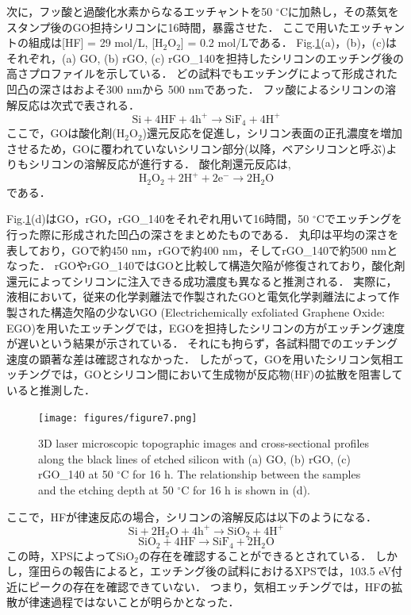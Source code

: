 \documentclass[platex,dvipdfmx]{jlreq}			%
\begin{document}
次に，フッ酸と過酸化水素からなるエッチャントを50 ${}^\circ$Cに加熱し，その蒸気をスタンプ後のGO担持シリコンに16時間，暴露させた．
ここで用いたエッチャントの組成は[HF] = 29 mol/L, [H$_2$O$_2$] = 0.2 mol/Lである．
Fig.\ref{fig:Laser}(a)，(b)，(c)はそれぞれ，(a) GO, (b) rGO, (c) rGO\_140を担持したシリコンのエッチング後の高さプロファイルを示している．
どの試料でもエッチングによって形成された凹凸の深さはおよそ300 nmから 500 nmであった．
フッ酸によるシリコンの溶解反応は次式で表される\supercite{fukuta_vapor_2003, hildreth_vapor_2014}．
\begin{displaymath}
    \mathrm{Si + 4HF + 4h^+ \rightarrow SiF_4 + 4H^+}
\end{displaymath}
ここで，GOは酸化剤(H$_2$O$_2$)還元反応を促進し，シリコン表面の正孔濃度を増加させるため，GOに覆われていないシリコン部分(以降，ベアシリコンと呼ぶ)よりもシリコンの溶解反応が進行する\supercite{kubota_chemical_2019}．
酸化剤還元反応は,
\begin{displaymath}
    \mathrm{H_2O_2 + 2H^+ + 2e^- \rightarrow 2H_2O}
\end{displaymath}
である．

Fig.\ref{fig:Laser}(d)はGO，rGO，rGO\_140をそれぞれ用いて16時間，50 ${}^\circ$Cでエッチングを行った際に形成された凹凸の深さをまとめたものである．
丸印は平均の深さを表しており，GOで約450 nm，rGOで約400 nm，そしてrGO\_140で約500 nmとなった．
rGOやrGO\_140ではGOと比較して構造欠陥が修復されており，酸化剤還元によってシリコンに注入できる成功濃度も異なると推測される．
実際に，液相において，従来の化学剥離法で作製されたGOと電気化学剥離法によって作製された構造欠陥の少ないGO (Electrichemically exfoliated Graphene Oxide: EGO)を用いたエッチングでは，EGOを担持したシリコンの方がエッチング速度が遅いという結果が示されている\supercite{kubota_chemical_2021}．
それにも拘らず，各試料間でのエッチング速度の顕著な差は確認されなかった．
したがって，GOを用いたシリコン気相エッチングでは，GOとシリコン間において生成物が反応物(HF)の拡散を阻害していると推測した．

\begin{figure}[H]
    \centering
    \texttt{[image: figures/figure7.png]}
    \caption{3D laser microscopic topographic images and cross-sectional profiles along the black lines of etched silicon with (a) GO, (b) rGO, (c) rGO\_140 at 50 ${}^\circ$C for 16 h. The relationship between the samples and the etching depth at 50 ${}^\circ$C for 16 h is shown in (d).}
    \label{fig:Laser}
\end{figure}

ここで，HFが律速反応の場合，シリコンの溶解反応は以下のようになる\supercite{fukami_roles_2018}．
\begin{displaymath}
    \mathrm{Si + 2H_2O+ 4h^+ \rightarrow SiO_2 + 4H^+}
\end{displaymath}
\begin{displaymath}
    \mathrm{SiO_2 + 4HF \rightarrow SiF_4 + 2H_2O}
\end{displaymath}
この時，XPSによってSiO$_2$の存在を確認することができるとされている．
しかし，窪田らの報告によると，エッチング後の試料におけるXPSでは，103.5 eV付近にピークの存在を確認できていない\supercite{kubota_vapor-phase_2022}．
つまり，気相エッチングでは，HFの拡散が律速過程ではないことが明らかとなった．
\end{document}
